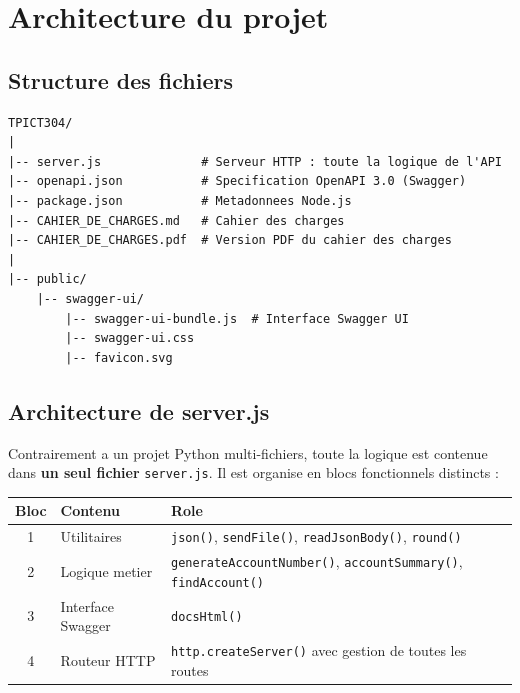 \documentclass[12pt,a4paper]{article}
\begin{document}
\section{Architecture du projet}

\subsection{Structure des fichiers}

\begin{lstlisting}[style=bash, caption={Arborescence du projet}]
TPICT304/
|
|-- server.js              # Serveur HTTP : toute la logique de l'API
|-- openapi.json           # Specification OpenAPI 3.0 (Swagger)
|-- package.json           # Metadonnees Node.js
|-- CAHIER_DE_CHARGES.md   # Cahier des charges
|-- CAHIER_DE_CHARGES.pdf  # Version PDF du cahier des charges
|
|-- public/
    |-- swagger-ui/
        |-- swagger-ui-bundle.js  # Interface Swagger UI
        |-- swagger-ui.css
        |-- favicon.svg
\end{lstlisting}

\subsection{Architecture de server.js}

Contrairement a un projet Python multi-fichiers, toute la logique est contenue dans \textbf{un seul fichier} \texttt{server.js}. Il est organise en blocs fonctionnels distincts :

\begin{center}
\begin{tabular}{clp{8cm}}
\toprule
\textbf{Bloc} & \textbf{Contenu} & \textbf{Role} \\
\midrule
1 & Utilitaires & \texttt{json()}, \texttt{sendFile()}, \texttt{readJsonBody()}, \texttt{round()} \\
2 & Logique metier & \texttt{generateAccountNumber()}, \texttt{accountSummary()}, \texttt{findAccount()} \\
3 & Interface Swagger & \texttt{docsHtml()} \\
4 & Routeur HTTP & \texttt{http.createServer()} avec gestion de toutes les routes \\
\bottomrule
\end{tabular}
\end{center}

\end{document}
